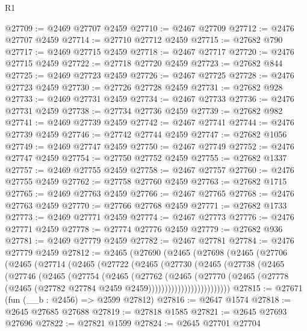 \begin{lexlean}{R1}
\begin{coremodule}
@27709 := @2469 @27707 @2459
@27710 := @2467 @27709
@27712 := @2476 @27707 @2459
@27714 := @27710 @27712 @2459
@27715 := @27682 @790
@27717 := @2469 @27715 @2459
@27718 := @2467 @27717
@27720 := @2476 @27715 @2459
@27722 := @27718 @27720 @2459
@27723 := @27682 @844
@27725 := @2469 @27723 @2459
@27726 := @2467 @27725
@27728 := @2476 @27723 @2459
@27730 := @27726 @27728 @2459
@27731 := @27682 @928
@27733 := @2469 @27731 @2459
@27734 := @2467 @27733
@27736 := @2476 @27731 @2459
@27738 := @27734 @27736 @2459
@27739 := @27682 @982
@27741 := @2469 @27739 @2459
@27742 := @2467 @27741
@27744 := @2476 @27739 @2459
@27746 := @27742 @27744 @2459
@27747 := @27682 @1056
@27749 := @2469 @27747 @2459
@27750 := @2467 @27749
@27752 := @2476 @27747 @2459
@27754 := @27750 @27752 @2459
@27755 := @27682 @1337
@27757 := @2469 @27755 @2459
@27758 := @2467 @27757
@27760 := @2476 @27755 @2459
@27762 := @27758 @27760 @2459
@27763 := @27682 @1715
@27765 := @2469 @27763 @2459
@27766 := @2467 @27765
@27768 := @2476 @27763 @2459
@27770 := @27766 @27768 @2459
@27771 := @27682 @1733
@27773 := @2469 @27771 @2459
@27774 := @2467 @27773
@27776 := @2476 @27771 @2459
@27778 := @27774 @27776 @2459
@27779 := @27682 @936
@27781 := @2469 @27779 @2459
@27782 := @2467 @27781
@27784 := @2476 @27779 @2459
@27812 := @2465
    (@27690
      (@2465
        (@27698
          (@2465
            (@27706
              (@2465
                (@27714
                  (@2465
                    (@27722
                      (@2465
                        (@27730
                          (@2465
                            (@27738
                              (@2465
                                (@27746
                                  (@2465
                                    (@27754
                                      (@2465
                                        (@27762
                                          (@2465
                                            (@27770
                                              (@2465
                                                (@27778
                                                  (@2465
                                                    (@27782
                                                      @27784
                                                      @2459
                                                      @2459)))))))))))))))))))))))))
@27815 := @27671 (fun (__b : @2456) => @2599 @27812)
@27816 := @2647 @1574
@27818 := @2645 @27685 @27688
@27819 := @27818 @1585
@27821 := @2645 @27693 @27696
@27822 := @27821 @1599
@27824 := @2645 @27701 @27704

\end{coremodule}
\end{lexlean}
